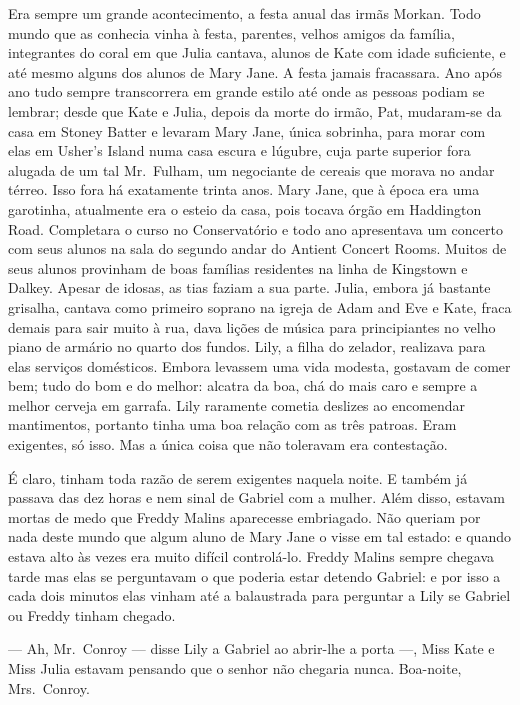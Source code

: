 Era sempre um grande acontecimento, a festa anual das irmãs Morkan.  Todo mundo
que as conhecia vinha à festa, parentes, velhos amigos da família, integrantes
do coral em que Julia cantava, alunos de Kate com idade suficiente, e até mesmo
alguns dos alunos de Mary Jane.  A festa jamais fracassara.  Ano após ano tudo
sempre transcorrera em grande estilo até onde as pessoas podiam se lembrar;
desde que Kate e Julia, depois da morte do irmão, Pat, mudaram-se da casa em
Stoney Batter e levaram Mary Jane, única sobrinha, para morar com elas em
Usher’s Island numa casa escura e lúgubre, cuja parte superior fora alugada de
um tal Mr.~Fulham, um negociante de cereais que morava no andar térreo.  Isso
fora há exatamente trinta anos.  Mary Jane, que à época era uma garotinha,
atualmente era o esteio da casa, pois tocava órgão em Haddington Road.
Completara o curso no Conservatório e todo ano apresentava um concerto com seus
alunos na sala do segundo andar do Antient Concert Rooms.  Muitos de seus
alunos provinham de boas famílias residentes na linha de Kingstown e Dalkey.
Apesar de idosas, as tias faziam a sua parte.  Julia, embora já bastante
grisalha, cantava como primeiro soprano na igreja de Adam and Eve e Kate, fraca
demais para sair muito à rua, dava lições de música para principiantes no velho
piano de armário no quarto dos fundos.  Lily, a filha do zelador, realizava
para elas serviços domésticos.  Embora levassem uma vida modesta, gostavam de
comer bem; tudo do bom e do melhor: alcatra da boa, chá do mais caro e sempre a
melhor cerveja em garrafa.  Lily raramente cometia deslizes ao encomendar
mantimentos, portanto tinha uma boa relação com as três patroas.  Eram
exigentes, só isso.  Mas a única coisa que não toleravam era contestação.

É claro, tinham toda razão de serem exigentes naquela noite.  E também já
passava das dez horas e nem sinal de Gabriel com a mulher.  Além disso, estavam
mortas de medo que Freddy Malins aparecesse embriagado.  Não queriam por nada
deste mundo que algum aluno de Mary Jane o visse em tal estado: e quando estava
alto às vezes era muito difícil controlá-lo.  Freddy Malins sempre chegava
tarde mas elas se perguntavam o que poderia estar detendo Gabriel: e por isso a
cada dois minutos elas vinham até a balaustrada para perguntar a Lily se
Gabriel ou Freddy tinham chegado.

--- Ah, Mr.~Conroy --- disse Lily a Gabriel ao abrir-lhe a porta ---, Miss Kate
e Miss Julia estavam pensando que o senhor não chegaria nunca.  Boa-noite, Mrs.~Conroy.

